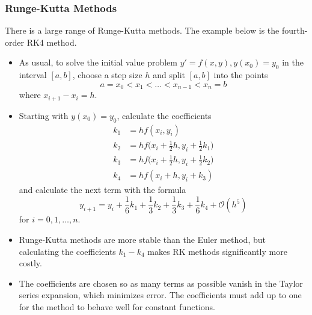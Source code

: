 \documentclass[11pt, a4paper]{article}
\begin{document}
\subsubsection{Runge-Kutta Methods}
There is a large range of Runge-Kutta methods. The example below is the fourth-order RK4 method.
\begin{itemize}
	\item As usual, to solve the initial value problem $ y' = f(x, y),  y(x_{0}) = y_{0} $ in the interval $ [a, b] $, choose a step size $ h $ and split $ [a, b] $ into the points
	\begin{equation*}
		a = x_0 < x_1 < \dots < x_{n-1} < x_{n} = b
	\end{equation*}
	where $ x_{i+1} - x_{i} = h$.
	
	\item Starting with $ y(x_{0}) = y_{0}$, calculate the coefficients 
	\begin{align*}
		 k_{1} &= hf(x_{i}, y_{i}) \\
		 k_{2} &= hf \big (x_{i} + \tfrac{1}{2}h, y_{i} + \tfrac{1}{2} k_{1} \big ) \\
		 k_{3} &= hf \big (x_{i} + \tfrac{1}{2}h, y_{i} + \tfrac{1}{2} k_{2} \big ) \\
		 k_{4} &= hf(x_{i} + h, y_{i} + k_{3})
	\end{align*}
	and calculate the next term with the formula
	\begin{equation*}
		y_{i+1} = y_{i} + \frac{1}{6}k_{1} + \frac{1}{3}k_{2} + \frac{1}{3}k_{3} + \frac{1}{6}k_{4} + \mathcal{O}(h^{5})
	\end{equation*}
	for $ i = 0, 1, \ldots, n $.

	\item Runge-Kutta methods are more stable than the Euler method, but calculating the coefficients $ k_{1}-k_{4} $ makes RK methods significantly more costly.
	
	\item The coefficients are chosen so as many terms as possible vanish in the Taylor series expansion, which minimizes error. The coefficients must add up to one for the method to behave well for constant functions. 

\end{itemize}
\end{document}
